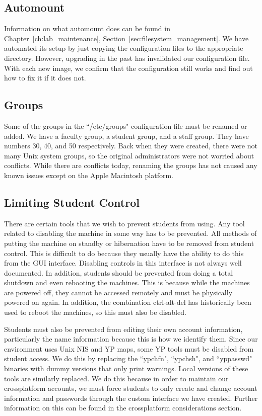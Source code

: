 \subsection{Automount}
Information on what automount does can be found in Chapter~\ref{ch:lab_maintenance}, Section~\ref{sec:filesystem_management}.  We have automated its setup by just copying the configuration files to the appropriate directory.  However, upgrading in the past has invalidated our configuration file.  With each new image, we confirm that the configuration still works and find out how to fix it if it does not. 

\subsection{Groups}
Some of the groups in the ``/etc/groups" configuration file must be renamed or added.  We have a faculty group, a student group, and a staff group.  They have numbers 30, 40, and 50 respectively.  Back when they were created, there were not many Unix system groups, so the original administrators were not worried about conflicts.  While there are conflicts today, renaming the groups has not caused any known issues except on the Apple Macintosh platform.  

\subsection{Limiting Student Control}
There are certain tools that we wish to prevent students from using.  Any tool related to disabling the machine in some way has to be prevented.  All methods of putting the machine on standby or hibernation have to be removed from student control.  This is difficult to do because they usually have the ability to do this from the GUI interface.  Disabling controls in this interface is not always well documented.  In addition, students should be prevented from doing a total shutdown and even rebooting the machines.  This is because while the machines are powered off, they cannot be accessed remotely and must be physically powered on again.  In addition, the combination ctrl-alt-del has historically been used to reboot the machines, so this must also be disabled.  

Students must also be prevented from editing their own account information, particularly the name information because this is how we identify them.  Since our environment uses Unix NIS and YP  maps, some YP tools must be disabled from student access.  We do this by replacing the ``ypchfn", ``ypchsh", and ``yppasswd" binaries with dummy versions that only print warnings.  Local versions of these tools are similarly replaced.  We do this because in order to maintain our crossplatform accounts, we must force students to only create and change account information and passwords through the custom interface we have created.  Further information on this can be found in the crossplatform considerations section.

